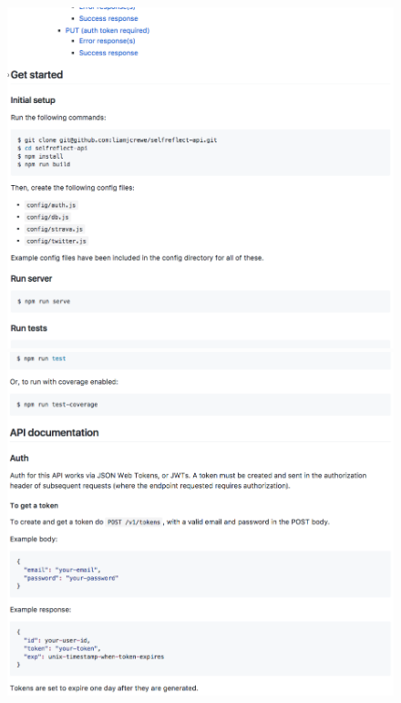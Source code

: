 \documentclass[11pt,openright,a4paper]{report}
\begin{document}
\begin{appendices}
\begin{figure}[ht]
  \centering
  \includegraphics[width=.9\textwidth]{i/apidocs3.png}
  \includegraphics[width=.9\textwidth]{i/apidocs4.png}
\end{figure}


\end{appendices}
\end{document}
